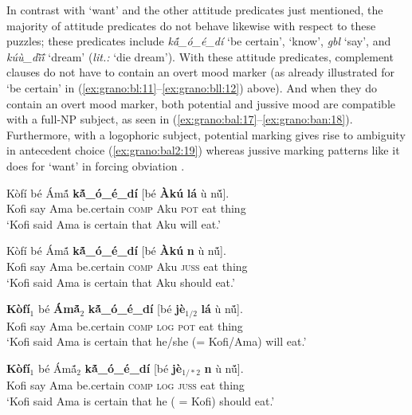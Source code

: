 \documentclass[output=paper,modfonts,nonflat]{langsci/langscibook}
\begin{document}
In contrast with `want' and the other attitude predicates just mentioned, the majority of attitude predicates do not behave likewise with respect to these puzzles; these predicates include \emph{k\'{\~a}\_{\D}\'o\_\'e\_d{\Z}\'i} `be certain', \emph{{\ny}{\á}} `know', \emph{gbl{\Ò}} `say', and \emph{k\'u\`u\_d{\R}\`{\~i}\'{\~i}} `dream' (\emph{lit.:} `die dream'). With these attitude predicates, complement clauses do not have to contain an overt mood marker (as already illustrated for `be certain' in (\ref{ex:grano:bl:11}--\ref{ex:grano:bll:12}) above). And when they do contain an overt mood marker, both potential and jussive mood are compatible with a full-NP subject, as seen in (\ref{ex:grano:bal:17}--\ref{ex:grano:ban:18}). Furthermore, with a logophoric subject, potential marking gives rise to ambiguity in antecedent choice (\ref{ex:grano:bal2:19}) whereas jussive marking patterns like it does for `want' in forcing obviation .

\ea
\gll K\`of\'i b\'e \'Am\'{\~a} \textbf{k\'{\~a}\_{\D}\'o\_\'e\_d{\Z}\'i} [b\'e \textbf{\`Ak\'u} \textbf{l\'a} {\D}\`u n\'{\~u}].\\
Kofi say Ama be.certain \textsc{comp} Aku \textsc{pot} eat thing\\
\glt`Kofi said Ama is certain that Aku will eat.' \label{ex:grano:bal:17}  
\z

\ea
\gll K\`of\'i b\'e \'Am\'{\~a}  \textbf{k\'{\~a}\_{\D}\'o\_\'e\_d{\Z}\'i} [b\'e \textbf{\`Ak\'u} \textbf{n{\É}} {\D}\`u n\'{\~u}].\\
Kofi say Ama be.certain \textsc{comp} Aku \textsc{juss} eat thing\\
\glt `Kofi said Ama is certain that Aku should eat.' \label{ex:grano:ban:18}  
\z

\ea 
\gll \textbf{K\`of\'i$_{1}$} b\'e \textbf{\'Am\'{\~a}$_{2}$} \textbf{k\'{\~a}\_{\D}\'o\_\'e\_d{\Z}\'i} [b\'e \textbf{j\`e$_{1/2}$} \textbf{l\'a} {\D}\`u n\'{\~u}].\\
Kofi say Ama be.certain \textsc{comp} \textsc{log} \textsc{pot} eat thing\\
\glt `Kofi said Ama is certain that he/she (= Kofi/Ama) will eat.'  \label{ex:grano:bal2:19}
\z

\ea
\gll \textbf{K\`of\'i$_{1}$} b\'e  \'Am\'{\~a}$_{2}$ \textbf{k\'{\~a}\_{\D}\'o\_\'e\_d{\Z}\'i} [b\'e \textbf{j\`e$_{1/*2}$} \textbf{n{\É}} {\D}\`u n\'{\~u}].\\
Kofi say Ama be.certain \textsc{comp} \textsc{log} \textsc{juss} eat thing\\
\glt `Kofi said Ama is certain that he ( = Kofi) should eat.'  \label{ex:grano:ban2:20}
\z
\end{document}
